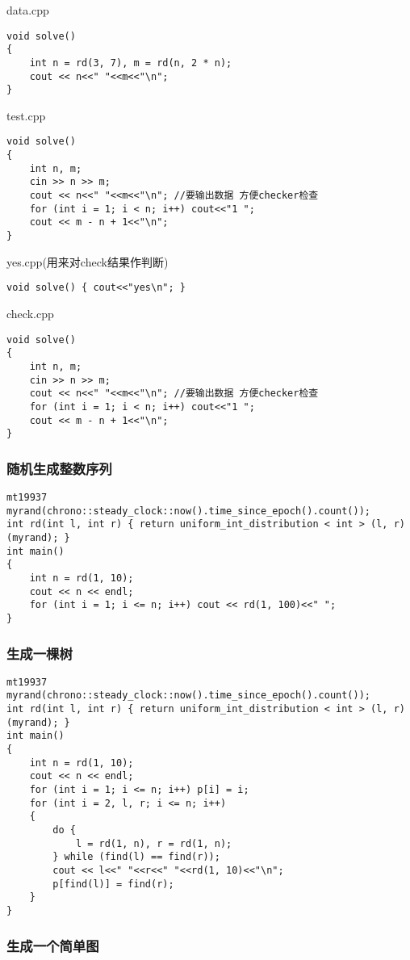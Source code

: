 \documentclass[a4paper,fontset=none]{ctexart}
\begin{document}
data.cpp
\begin{verbatim}
void solve()
{
    int n = rd(3, 7), m = rd(n, 2 * n);
    cout << n<<" "<<m<<"\n";
}
\end{verbatim}

test.cpp
\begin{verbatim}
void solve()
{
    int n, m;
    cin >> n >> m;
    cout << n<<" "<<m<<"\n"; //要输出数据 方便checker检查
    for (int i = 1; i < n; i++) cout<<"1 ";
    cout << m - n + 1<<"\n";
}
\end{verbatim}

yes.cpp(用来对check结果作判断)
\begin{verbatim}
void solve() { cout<<"yes\n"; }
\end{verbatim}

check.cpp
\begin{verbatim}
void solve()
{
    int n, m;
    cin >> n >> m;
    cout << n<<" "<<m<<"\n"; //要输出数据 方便checker检查
    for (int i = 1; i < n; i++) cout<<"1 ";
    cout << m - n + 1<<"\n";
}
\end{verbatim}
\subsubsection{随机生成整数序列}

\begin{verbatim}
mt19937 myrand(chrono::steady_clock::now().time_since_epoch().count());
int rd(int l, int r) { return uniform_int_distribution < int > (l, r)(myrand); }
int main()
{
    int n = rd(1, 10);
    cout << n << endl;
    for (int i = 1; i <= n; i++) cout << rd(1, 100)<<" ";
}
\end{verbatim}
\subsubsection{生成一棵树}

\begin{verbatim}
mt19937 myrand(chrono::steady_clock::now().time_since_epoch().count());
int rd(int l, int r) { return uniform_int_distribution < int > (l, r)(myrand); }
int main()
{
    int n = rd(1, 10);
    cout << n << endl;
    for (int i = 1; i <= n; i++) p[i] = i;
    for (int i = 2, l, r; i <= n; i++)
    {
        do {
            l = rd(1, n), r = rd(1, n);
        } while (find(l) == find(r));
        cout << l<<" "<<r<<" "<<rd(1, 10)<<"\n";
        p[find(l)] = find(r);
    }
}
\end{verbatim}
\subsubsection{生成一个简单图}
\end{document}
